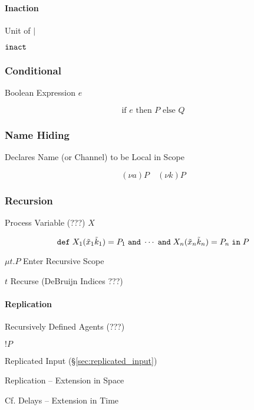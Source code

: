 \paragraph{Inaction}\label{sec:inaction}\hfill

Unit of $|$

$\mathtt{inact}$



\subsubsection{Conditional}\label{sec:conditional}

Boolean Expression $e$

\[
  \text{if } e \text{ then } P \text{ else } Q
\]



\subsubsection{Name Hiding}\label{sec:name_hiding}

Declares Name (or Channel) to be Local in Scope

\[
  (\nu a)P \quad (\nu k)P
\]



\subsubsection{Recursion}\label{sec:process_recursion}

Process Variable (???) $X$

\[
  \mathtt{def} \; X_1(\tilde{x}_1 \tilde{k}_1)
  = P_1 \; \mathtt{and} \; \cdots \; \mathtt{and} \;
  X_n(\tilde{x}_n \tilde{k}_n) = P_n \; \mathtt{in} \; P
\]

$\mu t.P$ Enter Recursive Scope

$t$ Recurse (DeBruijn Indices ???) %



\paragraph{Replication}\label{sec:replication}\hfill

Recursively Defined Agents (???)

$!P$

Replicated Input (\S\ref{sec:replicated_input})

Replication -- Extension in Space

\fist Cf. Delays -- Extension in Time \cite{abramsky-gay-nagarajan96}



